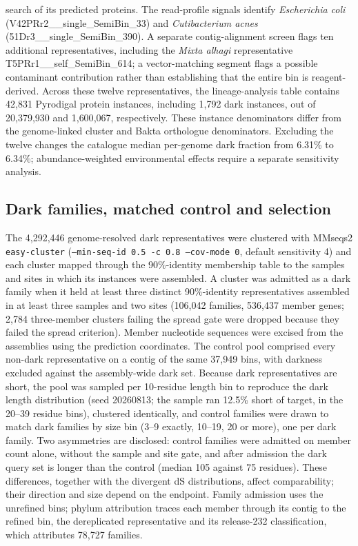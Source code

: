 \documentclass[11pt]{article}
\begin{document}
search of its predicted proteins. The read-profile signals identify \emph{Escherichia coli} (V42PRr2\_\_single\_SemiBin\_33) and \emph{Cutibacterium acnes} (51Dr3\_\_single\_SemiBin\_390). A separate contig-alignment screen flags ten additional representatives, including the \emph{Mixta alhagi} representative T5PRr1\_\_self\_SemiBin\_614; a vector-matching segment flags a possible contaminant contribution rather than establishing that the entire bin is reagent-derived. Across these twelve representatives, the lineage-analysis table contains 42{,}831 Pyrodigal protein instances, including 1{,}792 dark instances, out of 20{,}379{,}930 and 1{,}600{,}067, respectively. These instance denominators differ from the genome-linked cluster and Bakta orthologue denominators. Excluding the twelve changes the catalogue median per-genome dark fraction from 6.31\% to 6.34\%; abundance-weighted environmental effects require a separate sensitivity analysis.

\subsection*{Dark families, matched control and selection}
The 4{,}292{,}446 genome-resolved dark representatives were clustered with MMseqs2
\texttt{easy-cluster} (\texttt{--min-seq-id 0.5 -c 0.8 --cov-mode 0}, default sensitivity 4) and each
cluster mapped through the 90\%-identity membership table to the samples and sites in which its
instances were assembled. A cluster was admitted as a dark family when it held at least three
distinct 90\%-identity representatives assembled in at least three samples and two sites (106{,}042
families, 536{,}437 member genes; 2{,}784 three-member clusters failing the spread gate were dropped
because they failed the spread criterion). Member nucleotide sequences were excised from the assemblies using the
prediction coordinates. The control pool comprised every non-dark representative on a contig of the
same 37{,}949 bins, with darkness excluded against the assembly-wide dark set. Because dark
representatives are short, the pool was sampled per 10-residue length bin to reproduce the dark
length distribution (seed 20260813; the sample ran 12.5\% short of target, in the 20--39 residue
bins), clustered identically, and control families were drawn to match dark families by size bin
(3--9 exactly, 10--19, 20 or more), one per dark family. Two asymmetries are disclosed: control
families were admitted on member count alone, without the sample and site gate, and after admission
the dark query set is longer than the control (median 105 against 75 residues). These differences, together with the divergent dS distributions, affect comparability; their
direction and size depend on the endpoint. Family admission uses the unrefined bins; phylum attribution traces each member
through its contig to the refined bin, the dereplicated representative and its release-232
classification, which attributes 78{,}727 families.
\end{document}
